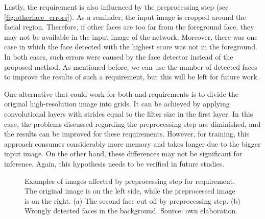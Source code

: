 Lastly, the \otherfacesortoys requirement is also influenced by the preprocessing step (see \autoref{fig:otherface_errors}). As a reminder, the input image is cropped around the facial region. Therefore, if other faces are too far from the foreground face, they may not be available in the input image of the network. Moreover, there was one case in which the face detected with the highest score was not in the foreground. In both cases, such errors were caused by the face detector instead of the proposed method. As mentioned before, we can use the number of detected faces to improve the results of such a requirement, but this will be left for future work.
 
 
One alternative that could work for both \pixelation and \otherfacesortoys requirements is to divide the original high-resolution image into grids. It can be achieved by applying convolutional layers with strides equal to the filter size in the first layer. In this case, the problems discussed regarding the preprocessing step are diminished, and the results can be improved for these requirements. However, for training, this approach consumes considerably more memory and takes longer due to the bigger input image. On the other hand, these differences may not be significant for inference. Again, this hypothesis needs to be verified in future studies.
 
\begin{figure}[htb]
\centering
{}
\hfill
{} 
\caption{Examples of images affected by preprocessing step for \otherfacesortoys requirement. The original image is on the left side, while the preprocessed image is on the right. (a) The second face cut off by preprocessing step. (b) Wrongly detected faces in the background. Source: own elaboration.}
\label{fig:otherface_errors}
\end{figure}
 

